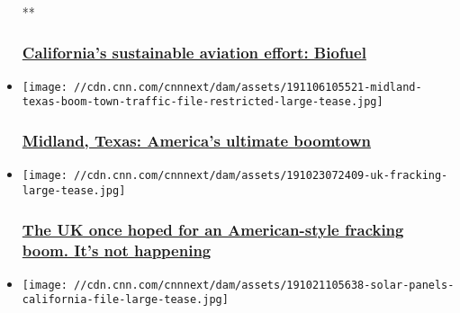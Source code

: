 \begin{itemize}
  **

  \hypertarget{californias-sustainable-aviation-effort-biofuel}{%
  \subsubsection{\texorpdfstring{\href{/videos/business/2019/11/19/sustainable-jet-fuel-california-gec.cnn-business}{California's
  sustainable aviation effort:
  Biofuel}}{California's sustainable aviation effort: Biofuel}}\label{californias-sustainable-aviation-effort-biofuel}}
\item
  \href{/2019/11/06/business/midland-texas-boomtown/index.html}{}

  \texttt{[image: //cdn.cnn.com/cnnnext/dam/assets/191106105521-midland-texas-boom-town-traffic-file-restricted-large-tease.jpg]}

  \hypertarget{midland-texas-americas-ultimate-boomtown}{%
  \subsubsection{\texorpdfstring{\href{/2019/11/06/business/midland-texas-boomtown/index.html}{Midland,
  Texas: America's ultimate
  boomtown}}{Midland, Texas: America's ultimate boomtown}}\label{midland-texas-americas-ultimate-boomtown}}
\item
  \href{/2019/10/24/business/uk-fracking-energy/index.html}{}

  \texttt{[image: //cdn.cnn.com/cnnnext/dam/assets/191023072409-uk-fracking-large-tease.jpg]}

  \hypertarget{the-uk-once-hoped-for-an-american-style-fracking-boom-its-not-happening-}{%
  \subsubsection{\texorpdfstring{\href{/2019/10/24/business/uk-fracking-energy/index.html}{The
  UK once hoped for an American-style fracking boom. It's not happening
  }}{The UK once hoped for an American-style fracking boom. It's not happening }}\label{the-uk-once-hoped-for-an-american-style-fracking-boom-its-not-happening-}}
\item
  \href{/2019/10/21/business/renewable-energy-solar-iea/index.html}{}

  \texttt{[image: //cdn.cnn.com/cnnnext/dam/assets/191021105638-solar-panels-california-file-large-tease.jpg]}

  \hypertarget{renewable-energy-is-booming-but-its-not-growing-fast-enough-to-fight-climate-change}{%
}
\end{itemize}
